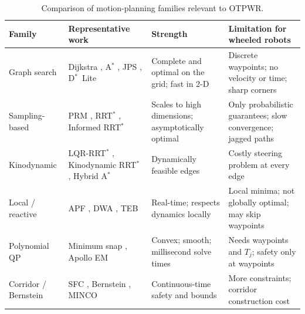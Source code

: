 \documentclass[11pt,a4paper]{article}
\begin{document}
\begin{table}[t]
  \centering
  \caption{Comparison of motion-planning families relevant to OTPWR.}
  \label{tab:lit}
  \small
  \begin{tabularx}{\textwidth}{@{}l L L L@{}}
    \toprule
    \textbf{Family} & \textbf{Representative work} & \textbf{Strength} & \textbf{Limitation for wheeled robots} \\
    \midrule
    Graph search &
      Dijkstra \citep{dijkstra1959note}, A$^\ast$ \citep{hart1968formal}, JPS \citep{harabor2011online}, D$^\ast$~Lite \citep{koenig2002dstar} &
      Complete and optimal on the grid; fast in 2-D &
      Discrete waypoints; no velocity or time; sharp corners \\
    \addlinespace
    Sampling-based &
      PRM \citep{kavraki1996probabilistic}, RRT$^\ast$ \citep{karaman2011sampling}, Informed RRT$^\ast$ \citep{gammell2014informed} &
      Scales to high dimensions; asymptotically optimal &
      Only probabilistic guarantees; slow convergence; jagged paths \\
    \addlinespace
    Kinodynamic &
      LQR-RRT$^\ast$ \citep{perez2012lqr}, Kinodynamic RRT$^\ast$ \citep{webb2013kinodynamic}, Hybrid A$^\ast$ \citep{dolgov2010path} &
      Dynamically feasible edges &
      Costly steering problem at every edge \\
    \addlinespace
    Local / reactive &
      APF \citep{khatib1986realtime}, DWA \citep{fox1997dwa}, TEB \citep{rosmann2017integrated} &
      Real-time; respects dynamics locally &
      Local minima; not globally optimal; may skip waypoints \\
    \addlinespace
    Polynomial QP &
      Minimum snap \citep{mellinger2011minimum,richter2016polynomial}, Apollo EM \citep{fan2018baidu} &
      Convex; smooth; millisecond solve times &
      Needs waypoints and $T_j$; safety only at waypoints \\
    \addlinespace
    Corridor / Bernstein &
      SFC \citep{liu2017planning}, Bernstein \citep{gao2018online}, MINCO \citep{wang2022geometrically} &
      Continuous-time safety and bounds &
      More constraints; corridor construction cost \\
    \bottomrule
  \end{tabularx}
\end{table}
\end{document}
